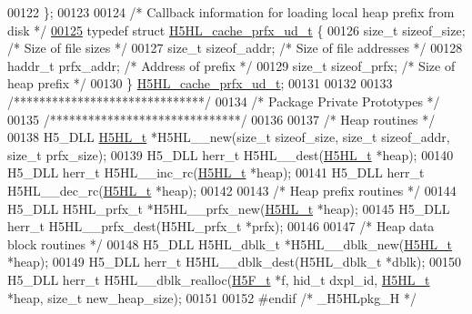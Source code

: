 \begin{DoxyCode}
00122 \};
00123 
00124 \textcolor{comment}{/* Callback information for loading local heap prefix from disk */}
\hyperlink{struct_h5_h_l__cache__prfx__ud__t}{00125} \textcolor{keyword}{typedef} \textcolor{keyword}{struct }\hyperlink{struct_h5_h_l__cache__prfx__ud__t}{H5HL\_cache\_prfx\_ud\_t} \{
00126     \textcolor{keywordtype}{size\_t} sizeof\_size;                 \textcolor{comment}{/* Size of file sizes */}
00127     \textcolor{keywordtype}{size\_t} sizeof\_addr;                 \textcolor{comment}{/* Size of file addresses */}
00128     haddr\_t prfx\_addr;                  \textcolor{comment}{/* Address of prefix */}
00129     \textcolor{keywordtype}{size\_t} sizeof\_prfx;                 \textcolor{comment}{/* Size of heap prefix */}
00130 \} \hyperlink{struct_h5_h_l__cache__prfx__ud__t}{H5HL\_cache\_prfx\_ud\_t};
00131 
00132 
00133 \textcolor{comment}{/******************************/}
00134 \textcolor{comment}{/* Package Private Prototypes */}
00135 \textcolor{comment}{/******************************/}
00136 
00137 \textcolor{comment}{/* Heap routines */}
00138 H5\_DLL \hyperlink{struct_h5_h_l__t}{H5HL\_t} *H5HL\_\_new(\textcolor{keywordtype}{size\_t} sizeof\_size, \textcolor{keywordtype}{size\_t} sizeof\_addr, \textcolor{keywordtype}{size\_t} prfx\_size);
00139 H5\_DLL herr\_t H5HL\_\_dest(\hyperlink{struct_h5_h_l__t}{H5HL\_t} *heap);
00140 H5\_DLL herr\_t H5HL\_\_inc\_rc(\hyperlink{struct_h5_h_l__t}{H5HL\_t} *heap);
00141 H5\_DLL herr\_t H5HL\_\_dec\_rc(\hyperlink{struct_h5_h_l__t}{H5HL\_t} *heap);
00142 
00143 \textcolor{comment}{/* Heap prefix routines */}
00144 H5\_DLL H5HL\_prfx\_t *H5HL\_\_prfx\_new(\hyperlink{struct_h5_h_l__t}{H5HL\_t} *heap);
00145 H5\_DLL herr\_t H5HL\_\_prfx\_dest(H5HL\_prfx\_t *prfx);
00146 
00147 \textcolor{comment}{/* Heap data block routines */}
00148 H5\_DLL H5HL\_dblk\_t *H5HL\_\_dblk\_new(\hyperlink{struct_h5_h_l__t}{H5HL\_t} *heap);
00149 H5\_DLL herr\_t H5HL\_\_dblk\_dest(H5HL\_dblk\_t *dblk);
00150 H5\_DLL herr\_t H5HL\_\_dblk\_realloc(\hyperlink{struct_h5_f__t}{H5F\_t} *f, hid\_t dxpl\_id, \hyperlink{struct_h5_h_l__t}{H5HL\_t} *heap, \textcolor{keywordtype}{size\_t} new\_heap\_size);
00151 
00152 \textcolor{preprocessor}{#endif }\textcolor{comment}{/* \_H5HLpkg\_H */}\textcolor{preprocessor}{}
\end{DoxyCode}
